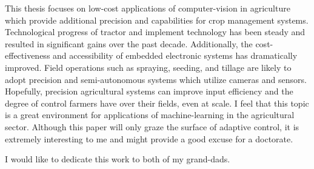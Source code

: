 \justify
This thesis focuses on low-cost applications of computer-vision in
agriculture which provide additional precision and capabilities for crop 
management systems. Technological progress of tractor and 
implement technology has been steady and resulted in significant gains
over the past decade. Additionally, the cost-effectiveness and
accessibility of embedded electronic systems has
dramatically improved. Field operations such as spraying, seeding, and 
tillage are likely to adopt precision and semi-autonomous systems
which utilize cameras and sensors. Hopefully, precision agricultural
systems can improve input efficiency and the degree of control farmers
have over their fields, even at scale. I feel that this topic is a great
environment for applications of machine-learning in the agricultural sector. 
Although this paper will only graze the surface of adaptive control,
it is extremely interesting to me and might provide a good excuse
for a doctorate. 

\begin{flushright}
I would like to dedicate this work to both of my grand-dads.
\end{flushright}